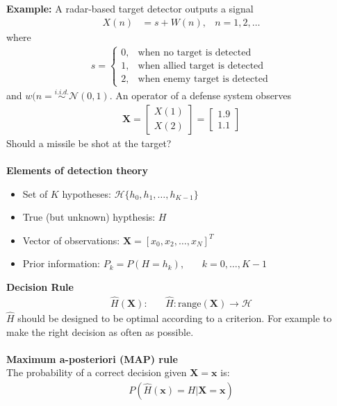 \documentclass[12pt,a4paper]{report}
\author{Frederik Appel Vardinghus-Nielsen}
\begin{document}
\\\\
\textbf{Example:} A radar-based target detector outputs a signal
\begin{align*}
X(n)&=s+W(n),&n=1,2,\ldots
\end{align*}
where
\begin{align*}
s=\begin{cases}0,&\text{when no target is detected}\\
1,&\text{when allied target is detected}\\
2,&\text{when enemy target is detected}\end{cases}
\end{align*}
and $w(n=\overset{i.i.d.}\sim\mathcal{N}(0,1)$. An operator of a defense system observes
\begin{align*}
\mathbf{X}=\begin{bmatrix}X(1)\\X(2)\end{bmatrix}=\begin{bmatrix}1.9\\1.1\end{bmatrix}
\end{align*}
Should a missile be shot at the target?\\\\
\textbf{Elements of detection theory}
\begin{itemize}
\item Set of $K$ hypotheses: $\mathcal{H}\{h_0,h_1,\ldots,h_{K-1}\}$
\item True (but unknown) hypthesis: $H$
\item Vector of observations: $\mathbf{X}=[x_0,x_2,\ldots,x_N]^T$
\item Prior information: $P_k=P(H=h_k),\phantom{mm}k=0,\ldots,K-1$
\end{itemize}
\textbf{Decision Rule}
\begin{align*}
\hat{H}(\mathbf{X}):\phantom{mm}\hat{H}:\text{range}(\mathbf{X})\to\mathcal{H}
\end{align*}
$\hat{H}$ should be designed to be optimal according to a criterion. For example to make the right decision as often as possible.\\\\
\textbf{Maximum a-posteriori (MAP) rule}\\
The probability of a correct decision given $\mathbf{X}=\mathbf{x}$ is:
\begin{align*}
P(\hat{H}(\mathbf{x})=H|\mathbf{X}=\mathbf{x})
\end{align*}
\end{document}
